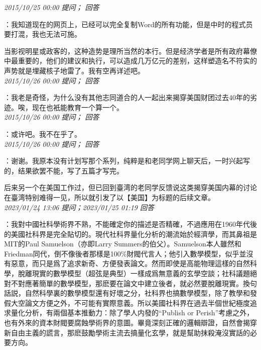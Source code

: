 \documentclass[twocolumn]{ctexart}
\begin{document}
\textit{\hfill\noindent\small 2015/10/25 00:00 提问； 回答}

：我知道现在的网页上，已经可以完全复制Word的所有功能，但是中时的程式员要打混，我也无法可施。

当影视明星或政客的，这种造势是理所当然的本行。但是经济学者是所有政府幕僚中最重要的，他们的建议和执行，可以造成几万亿元的差别，这样塑造名不符实的声势就是埋藏核子地雷了。我有空再详述吧。\\

\textit{\hfill\noindent\small 2015/10/26 00:00 提问； 回答}

：我老是奇怪，为什么没有其他志同道合的人一起出来揭穿美国财团过去40年的劣迹。唉，现在也衹能教育一个算一个。\\

\textit{\hfill\noindent\small 2015/10/26 00:00 提问； 回答}

：或许吧。我不在乎了。\\

\textit{\hfill\noindent\small 2015/10/26 00:00 提问； 回答}

：谢谢。我原本没有计划写那个系列，纯粹是和老同学网上聊天后，一时兴起写的，结果欲罢不能，写了五篇才写完。

后来另一个在美国工作过，但已回到臺湾的老同学反馈说这类揭穿美国内幕的讨论在臺湾特别难得一见，所以就引发了以【美国】为标题的后续文章。\\

\textit{\hfill\noindent\small 2023/01/24 13:06 提问；2023/01/25 01:19 回答}

：我對中國社科學術界不熟，不能確定你的描述是否精確，不過應用在1960年代後的美國社科界是完全貼切的。現代社科界量化分析的潮流始於經濟學，而其鼻祖是MIT的Paul Samuelson（亦即Larry Summers的伯父）。Samuelson本人雖然和Friedman同代，倒不像後者那樣是100\%財閥代言人；他引入數學模型，似乎並沒有惡意，而只是爲了追求新奇、方便發表論文。然而即使是高能物理這樣的自然科學，脫離現實的數學模型（超弦是典型）一樣成爲無意義的玄學空談；社科議題絕對不對應著簡單的數學模型，那麽要在論文中建立後者，就必然要脫離現實。換句話説，自然科學裏的數學模型還有好壞之分，社科界也搞數學模型，除了教學和發假大空論文方便之外，不可能有實際意義。所以美國社科界在過去半個世紀極度追求量化分析，有兩個基本推動力：除了學人内發的“Publish or Perish”考慮之外，也有外來的資本財閥要腐蝕學術界的意圖。畢竟深刻正確的邏輯辯證，自然會揭穿新自由主義的謊言，那麽鼓勵學術主流去搞量化玄學，就是幫助抹殺淹沒實話的必要方向。
\end{document}
